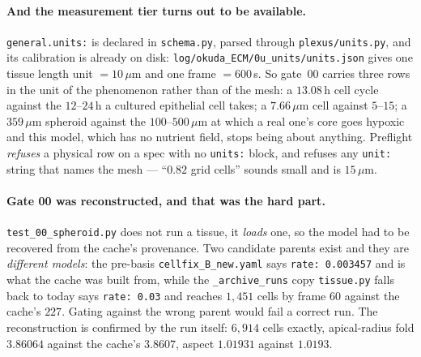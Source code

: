 \documentclass[11pt,a4paper]{article}
\newcommand{\code}[1]{\texttt{\small #1}}
\begin{document}
\paragraph{And the measurement tier turns out to be available.} \code{general.units:} is declared in
\code{schema.py}, parsed through \code{plexus/units.py}, and its calibration is already on disk:
\code{log/okuda\_ECM/0u\_units/units.json} gives one tissue length unit $=10\,\mu$m and one frame
$=600$\,s. So gate~00 carries three rows in the unit of the phenomenon rather than of the mesh: a
$13.08$\,h cell cycle against the $12$--$24$\,h a cultured epithelial cell takes; a $7.66\,\mu$m cell
against $5$--$15$; a $359\,\mu$m spheroid against the $100$--$500\,\mu$m at which a real one's core
goes hypoxic and this model, which has no nutrient field, stops being about anything. Preflight
\emph{refuses} a physical row on a spec with no \code{units:} block, and refuses any \code{unit:}
string that names the mesh --- ``$0.82$ grid cells'' sounds small and is $15\,\mu$m.

\paragraph{Gate 00 was reconstructed, and that was the hard part.} \code{test\_00\_spheroid.py} does
not run a tissue, it \emph{loads} one, so the model had to be recovered from the cache's provenance.
Two candidate parents exist and they are \emph{different models}: the pre-basis
\code{cellfix\_B\_new.yaml} says \code{rate: 0.003457} and is what the cache was built from, while
the \code{\_archive\_runs} copy \code{tissue.py} falls back to today says \code{rate: 0.03} and
reaches $1{,}451$ cells by frame $60$ against the cache's $227$. Gating against the wrong parent
would fail a correct run. The reconstruction is confirmed by the run itself: $6{,}914$ cells exactly,
apical-radius fold $3.86064$ against the cache's $3.8607$, aspect $1.01931$ against $1.0193$.
\end{document}

